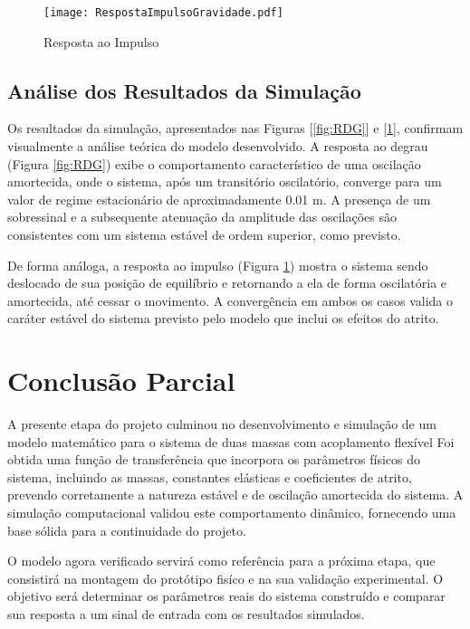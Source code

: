 \documentclass[9pt,a4paper,twocolumn,twoside]{tau-class/tau}
\begin{document}
\begin{figure}[H]
    \centering
    \texttt{[image: RespostaImpulsoGravidade.pdf]}
    \caption{Resposta ao Impulso}
    \label{fig:RIG}
\end{figure}


\subsection{Análise dos Resultados da Simulação}
Os resultados da simulação, apresentados nas Figuras [\ref{fig:RDG}] e [\ref{fig:RIG}], confirmam visualmente a análise teórica do modelo desenvolvido. A resposta ao degrau (Figura \ref{fig:RDG}) exibe o comportamento característico de uma oscilação amortecida, onde o sistema, após um transitório oscilatório, converge para um valor de regime estacionário de aproximadamente 0.01 m. A presença de um sobressinal e a subsequente atenuação da amplitude das oscilações são consistentes com um sistema estável de ordem superior, como previsto.

De forma análoga, a resposta ao impulso (Figura \ref{fig:RIG}) mostra o sistema sendo deslocado de sua posição de equilíbrio e retornando a ela de forma oscilatória e amortecida, até cessar o movimento. A convergência em ambos os casos valida o caráter estável do sistema previsto pelo modelo que inclui os efeitos do atrito.

\section{Conclusão Parcial}

 A presente etapa do projeto culminou no desenvolvimento e simulação de um modelo matemático para o sistema de duas massas com acoplamento flexível Foi obtida uma função de transferência que incorpora os parâmetros físicos do sistema, incluindo as massas, constantes elásticas e coeficientes de atrito, prevendo corretamente a natureza estável e de oscilação amortecida do sistema. A simulação computacional validou este comportamento dinâmico, fornecendo uma base sólida para a continuidade do projeto.

 O modelo agora verificado servirá como referência para a próxima etapa, que consistirá na montagem do protótipo fisíco e na sua validação experimental. O objetivo será determinar os parâmetros reais do sistema construído e comparar sua resposta a um sinal de entrada com os resultados simulados.



\printbibliography

\end{document}
